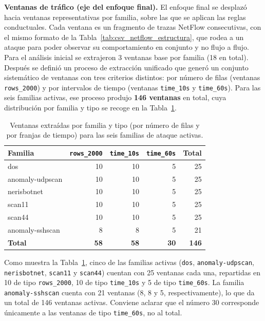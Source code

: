 \textbf{Ventanas de tráfico (eje del enfoque final).} El enfoque final se desplazó hacia ventanas representativas por familia, sobre las que se aplican las reglas conductuales. Cada ventana es un fragmento de trazas NetFlow consecutivas, con el mismo formato de la Tabla~\ref{tab:csv_netflow_estructura}, que rodea a un ataque para poder observar su comportamiento en conjunto y no flujo a flujo. Para el análisis inicial se extrajeron 3 ventanas base por familia (18 en total). Después se definió un proceso de extracción unificado que generó un conjunto sistemático de ventanas con tres criterios distintos: por número de filas (ventanas \texttt{rows\_2000}) y por intervalos de tiempo (ventanas \texttt{time\_10s} y \texttt{time\_60s}). Para las seis familias activas, ese proceso produjo \textbf{146 ventanas} en total, cuya distribución por familia y tipo se recoge en la Tabla~\ref{tab:ventanas}.

\begin{table}[ht]
\centering
\small
\begin{tabular}{|l|r|r|r|r|}
\hline
\textbf{Familia} & \texttt{rows\_2000} & \texttt{time\_10s} & \texttt{time\_60s} & \textbf{Total} \\
\hline
dos & 10 & 10 & 5 & 25 \\
\hline
anomaly-udpscan & 10 & 10 & 5 & 25 \\
\hline
nerisbotnet & 10 & 10 & 5 & 25 \\
\hline
scan11 & 10 & 10 & 5 & 25 \\
\hline
scan44 & 10 & 10 & 5 & 25 \\
\hline
anomaly-sshscan & 8 & 8 & 5 & 21 \\
\hline
\textbf{Total} & \textbf{58} & \textbf{58} & \textbf{30} & \textbf{146} \\
\hline
\end{tabular}
\caption{Ventanas extraídas por familia y tipo (por número de filas y por franjas de tiempo) para las seis familias de ataque activas.}
\label{tab:ventanas}
\end{table}

Como muestra la Tabla~\ref{tab:ventanas}, cinco de las familias activas (\texttt{dos}, \texttt{anomaly-udpscan}, \texttt{nerisbotnet}, \texttt{scan11} y \texttt{scan44}) cuentan con 25 ventanas cada una, repartidas en 10 de tipo \texttt{rows\_2000}, 10 de tipo \texttt{time\_10s} y 5 de tipo \texttt{time\_60s}. La familia \texttt{anomaly-sshscan} cuenta con 21 ventanas (8, 8 y 5, respectivamente), lo que da un total de 146 ventanas activas. Conviene aclarar que el número 30 corresponde únicamente a las ventanas de tipo \texttt{time\_60s}, no al total.

